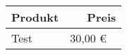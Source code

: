 \documentclass{article}
\begin{document}
\begin{center}
    \begin{tabular}{ l r }
        \hline
        Produkt & Preis  \\ \hline
        Test & 30,00 € \ \\
        \hline
    \end{tabular}
\end{center}
\end{document}
